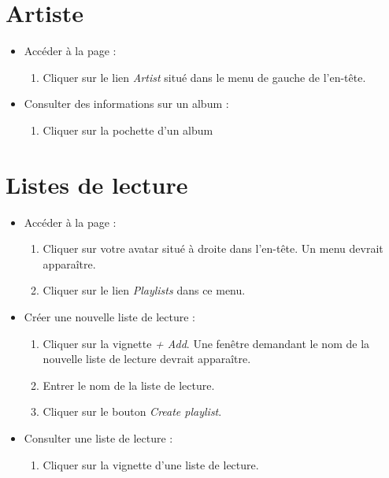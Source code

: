 \documentclass[12pt, letterpaper]{article}
\begin{document}
    \section*{Artiste}
    \begin{itemize}
        \item Accéder à la page :
        \begin{enumerate}
            \item Cliquer sur le lien \textit{Artist} situé dans le menu de gauche de l'en-tête.
        \end{enumerate}

        \item Consulter des informations sur un album :
        \begin{enumerate}
            \item Cliquer sur la pochette d'un album
        \end{enumerate}
    \end{itemize}

    \section*{Listes de lecture}
    \begin{itemize}
        \item Accéder à la page :
        \begin{enumerate}
            \item Cliquer sur votre avatar situé à droite dans l'en-tête. Un menu devrait apparaître.
            \item Cliquer sur le lien \textit{Playlists} dans ce menu.
        \end{enumerate}

        \item Créer une nouvelle liste de lecture :
        \begin{enumerate}
            \item Cliquer sur la vignette \textit{+ Add}. Une fenêtre demandant le nom de la nouvelle liste de lecture devrait apparaître.

            \item Entrer le nom de la liste de lecture.

            \item Cliquer sur le bouton \textit{Create playlist}.
        \end{enumerate}

        \item Consulter une liste de lecture :
        \begin{enumerate}
            \item Cliquer sur la vignette d'une liste de lecture.
        \end{enumerate}
    \end{itemize}
\end{document}
